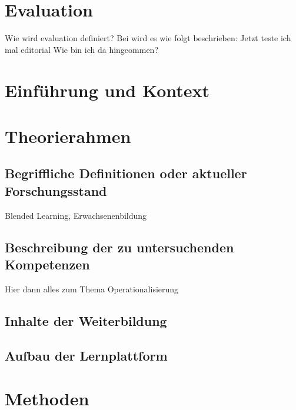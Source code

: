 \documentclass[12pt, bibliography=totoc]{scrartcl}
\begin{document}
%
\tableofcontents
\setcounter{page}{1}
\pagebreak

\section{Evaluation}\label{evaluation}

Wie wird evaluation definiert? Bei \textcite{askun2007web} wird es wie
folgt beschrieben: Jetzt teste ich mal \textcite{blau2012personality}
editorial Wie bin ich da hingeommen?

\section{Einführung und Kontext}\label{einfuxfchrung-und-kontext}

\section{Theorierahmen}\label{theorierahmen}

\subsection{Begriffliche Definitionen oder aktueller
Forschungsstand}\label{begriffliche-definitionen-oder-aktueller-forschungsstand}

Blended Learning, Erwachsenenbildung

\subsection{Beschreibung der zu untersuchenden
Kompetenzen}\label{beschreibung-der-zu-untersuchenden-kompetenzen}

Hier dann alles zum Thema Operationalisierung

\subsection{Inhalte der Weiterbildung}\label{inhalte-der-weiterbildung}

\subsection{Aufbau der Lernplattform}\label{aufbau-der-lernplattform}

\section{Methoden}\label{methoden}
\end{document}
